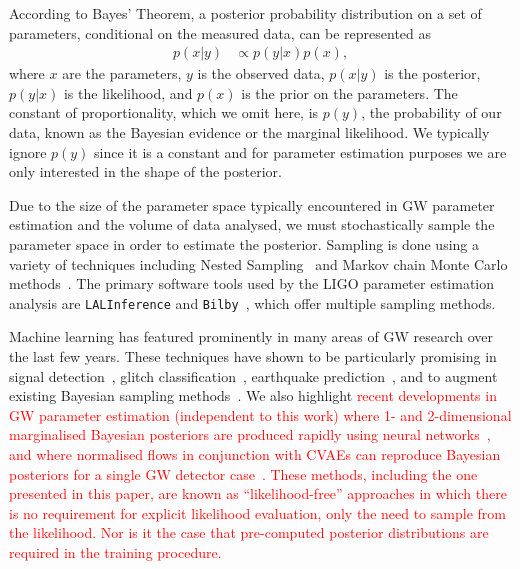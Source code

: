 \documentclass[%
showpacs,
nofootinbib,
 amsmath,amssymb,
 aps,
 twocolumn,
 prl,
 reprint,
floatfix,
]{revtex4-1}
\newcommand{\new}[1]{\textcolor{red}{#1}}
\begin{document}
%
%
According to Bayes' Theorem, a posterior probability distribution on a set of
parameters, conditional on the measured data, can be represented as
%
\begin{align}\label{eq:bayes_theorem} 
p(x|y) &\propto p(y|x) p(x), 
\end{align}
%
where $x$ are the parameters, $y$ is the observed data, $p(x|y)$ is the
posterior, $p(y|x)$ is the likelihood, and $p(x)$ is the prior on the
parameters. The constant of proportionality, which we omit here, is
$p(y)$, the probability of our data, known as the Bayesian evidence or the
marginal likelihood. We typically ignore $p(y)$ since it is a constant and for
parameter estimation purposes we are only interested in the shape of the
posterior.

%
%
Due to the size of the parameter space typically encountered in \ac{GW}
parameter estimation and the volume of data analysed, we must stochastically
sample the parameter space in order to estimate the posterior.  Sampling is
done using a variety of techniques including Nested
Sampling~\cite{skilling2006,cpnest,dynesty} and Markov chain Monte Carlo
methods~\cite{emcee,ptemcee}. The primary software tools used by the \ac{LIGO}
parameter estimation analysis are \texttt{LALInference} and
\texttt{Bilby}~\cite{1409.7215,1811.02042}, which offer multiple sampling
methods.  
  
%
%
Machine learning has featured prominently in many areas of \ac{GW} research
over the last few years. These techniques have shown to be particularly
promising in signal
detection~\cite{GEORGE201864,PhysRevLett.120.141103,GebKilParHarSch}, glitch
classification~\cite{0264-9381-34-6-064003}, earthquake
prediction~\cite{Coughlin_2017}, and to augment existing Bayesian sampling
methods~\cite{2012MNRAS.421..169G}. We also highlight \new{recent developments
in \ac{GW} parameter estimation (independent to this work) where 1- and
2-dimensional marginalised Bayesian posteriors are produced rapidly using
neural networks~\cite{2019arXiv190905966C}, and where normalised flows in
conjunction with \acp{CVAE} can reproduce Bayesian posteriors for a single
\ac{GW} detector case~\cite{2020arXiv200207656G}. These methods, including the
one presented in this paper, are known as ``likelihood-free'' approaches in
which there is no requirement for explicit likelihood evaluation, only the need
to sample from the likelihood. Nor is it the case that pre-computed posterior
distributions are required in the training procedure.}
\end{document}
